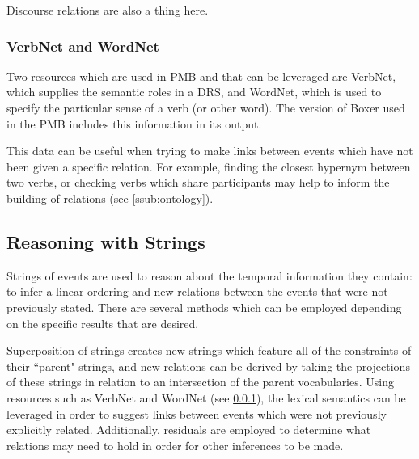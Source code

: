 \documentclass[a4paper,12pt,leqno]{article}
\begin{document}
Discourse relations are also a thing here.

\subsubsection{VerbNet and WordNet}\label{ssub:verbwordnet}
Two resources which are used in PMB and that can be leveraged are VerbNet, which supplies the semantic roles in a DRS, and WordNet, which is used to specify the particular sense of a verb (or other word). The version of Boxer used in the PMB includes this information in its output.

This data can be useful when trying to make links between events which have not been given a specific relation. For example, finding the closest hypernym between two verbs, or checking verbs which share participants may help to inform the building of relations (see \ref{ssub:ontology}).

\subsection{Reasoning with Strings}\label{sub:reasoning}
Strings of events are used to reason about the temporal information they contain: to infer a linear ordering and new relations between the events that were not previously stated. There are several methods which can be employed depending on the specific results that are desired.

Superposition of strings creates new strings which feature all of the constraints of their ``parent" strings, and new relations can be derived by taking the projections of these strings in relation to an intersection of the parent vocabularies. Using resources such as VerbNet and WordNet (see \ref{ssub:verbwordnet}), the lexical semantics can be leveraged in order to suggest links between events which were not previously explicitly related. Additionally, residuals are employed to determine what relations may need to hold in order for other inferences to be made.
\end{document}
